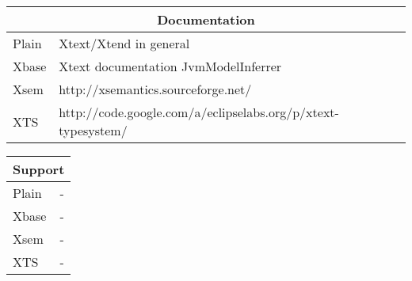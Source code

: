 \begin{frame}
\framebreak
\begin{tabularx}{\linewidth}{ l   X }
\multicolumn{2}{c}{Documentation} \\ \hline
Plain & Xtext/Xtend in general \\
Xbase & Xtext documentation JvmModelInferrer \\
Xsem & http://xsemantics.sourceforge.net/ \\
XTS & http://code.google.com/a/eclipselabs.org/p/xtext-typesystem/ \\
\end{tabularx}

\framebreak
\begin{tabularx}{\linewidth}{ l   X }
\multicolumn{2}{c}{Support} \\ \hline
Plain & - \\
Xbase & - \\
Xsem & - \\
XTS & - \\
\end{tabularx}
  
\end{frame}